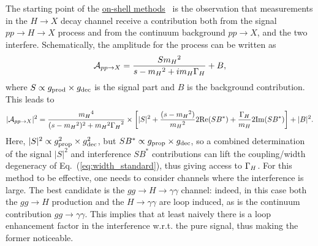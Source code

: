 The starting point of the \underline{on-shell
methods}~\cite{Dixon:2003yb,Martin:2012xc,Dixon:2013haa,Campbell:2017rke}
is the observation that measurements in the $H\to X$ decay channel
receive a contribution both from the signal $p p \to H \to X$ process
and from the continuum background $p p \to X$, and the two
interfere. Schematically, the amplitude for the process can be written
as
\begin{equation}
\mathcal A_{p p \to X} = \frac{S {m_H}^2}{s-{m_H}^2 + i {m_H}{\Gamma_H}} + B,
\end{equation}
where $S\propto g_{\rm prod}\times g_{\rm dec}$ is the signal part and $B$ is the background 
contribution. This leads to
\begin{equation}
|\mathcal A_{p p \to X}|^2 = \frac{{m_H}^4}{(s-{m_H}^2)^2 + {m_H}^2{\Gamma_H}^2}
\times\left[
|S|^2 + \frac{(s-{m_H}^2)}{{m_H}^2} 2{\rm Re}(S B^*) + \frac{{\Gamma_H}}{{m_H}} 2{\rm Im}(S B^*)
\right] + |B|^2.
\label{eq:width_gammagamma}
\end{equation}
Here, $|S|^2\propto g_{\rm prop}^2 \times g_{\rm dec}^2$, but 
$SB^*\propto g_{\rm prop}\times g_{\rm dec}$, so a combined determination of the signal $|S|^2$ and
interference $SB^*$ contributions can lift the coupling/width degeneracy of 
Eq.~(\ref{eq:width_standard}), thus giving access to ${\Gamma_H}$. 
For this method to be effective, one needs to consider channels where
the interference is large. The best candidate is the $gg\to H\to \gamma\gamma$ channel: indeed,
in this case both the $gg\to H$ production and the $H\to\gamma\gamma$ are loop induced, as is
the continuum contribution $gg\to\gamma\gamma$. This implies that at least naively there is a loop
enhancement factor in the interference w.r.t. the pure signal, thus making the former noticeable. 


